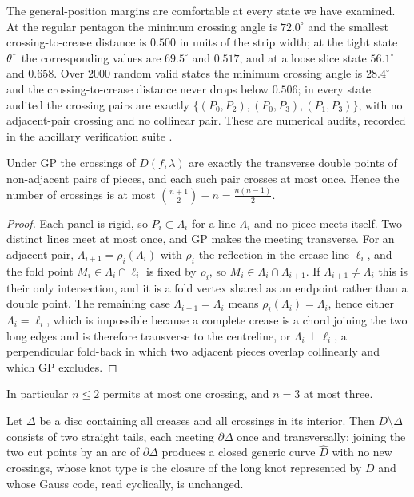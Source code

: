\begin{remark}\label{rem:gpaudit}
The general-position margins are comfortable at every state we have examined. At the regular pentagon the minimum crossing angle is $72.0^\circ$ and the smallest crossing-to-crease distance is $0.500$ in units of the strip width; at the tight state $\theta^\dagger$ the corresponding values are $69.5^\circ$ and $0.517$, and at a loose slice state $56.1^\circ$ and $0.658$. Over $2000$ random valid states the minimum crossing angle is $28.4^\circ$ and the crossing-to-crease distance never drops below $0.506$; in every state audited the crossing pairs are exactly $\{(P_0,P_2),(P_0,P_3),(P_1,P_3)\}$, with no adjacent-pair crossing and no collinear pair. These are numerical audits, recorded in the ancillary verification suite \cite{anc}.
\end{remark}

\begin{lemma}\label{lem:crossbound}
Under GP the crossings of $D(f,\lambda)$ are exactly the transverse double points of non-adjacent pairs of pieces, and each such pair crosses at most once. Hence the number of crossings is at most $\binom{n+1}2-n=\tfrac{n(n-1)}2$.
\end{lemma}

\begin{proof}
Each panel is rigid, so $P_i\subset\Lambda_i$ for a line $\Lambda_i$ and no piece meets itself. Two distinct lines meet at most once, and GP makes the meeting transverse. For an adjacent pair, $\Lambda_{i+1}=\rho_i(\Lambda_i)$ with $\rho_i$ the reflection in the crease line $\ell_i$, and the fold point $M_i\in\Lambda_i\cap\ell_i$ is fixed by $\rho_i$, so $M_i\in\Lambda_i\cap\Lambda_{i+1}$. If $\Lambda_{i+1}\ne\Lambda_i$ this is their only intersection, and it is a fold vertex shared as an endpoint rather than a double point. The remaining case $\Lambda_{i+1}=\Lambda_i$ means $\rho_i(\Lambda_i)=\Lambda_i$, hence either $\Lambda_i=\ell_i$, which is impossible because a complete crease is a chord joining the two long edges and is therefore transverse to the centreline, or $\Lambda_i\perp\ell_i$, a perpendicular fold-back in which two adjacent pieces overlap collinearly and which GP excludes.
\end{proof}

In particular $n\le2$ permits at most one crossing, and $n=3$ at most three.

\begin{lemma}\label{lem:closureop}
Let $\Delta$ be a disc containing all creases and all crossings in its interior. Then $D\setminus\Delta$ consists of two straight tails, each meeting $\partial\Delta$ once and transversally; joining the two cut points by an arc of $\partial\Delta$ produces a closed generic curve $\widehat D$ with no new crossings, whose knot type is the closure of the long knot represented by $D$ and whose Gauss code, read cyclically, is unchanged.
\end{lemma}

